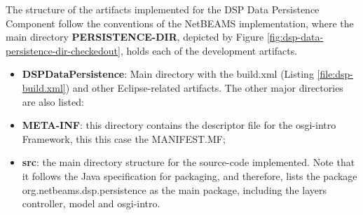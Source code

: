 The structure of the artifacts implemented for the DSP Data Persistence
Component follow the conventions of the NetBEAMS implementation, where the main
directory \textbf{PERSISTENCE-DIR}, depicted by Figure
\ref{fig:dsp-data-persistence-dir-checkedout}, holds each of the development
artifacts.

\begin{itemize}
  \item \textbf{DSPDataPersistence}: Main directory with the build.xml (Listing
  \ref{file:dsp-build.xml}) and other Eclipse-related artifacts. The other
  major directories are also listed:
  \item \textbf{META-INF}: this directory contains the descriptor file for
  the osgi-intro Framework, this this case the MANIFEST.MF;
  \item \textbf{src}: the main directory structure for the source-code
  implemented. Note that it follows the Java specification for packaging, and
  therefore, lists the package org.netbeams.dsp.persistence as the main
  package, including the layers controller, model and osgi-intro.
\end{itemize}

